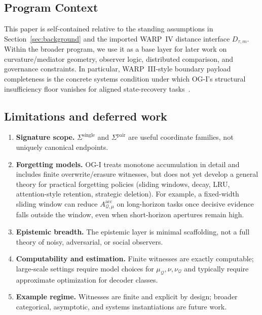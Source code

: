 \documentclass[11pt,twoside]{article}
\theoremstyle{definition}
\newcommand{\acc}{\mathrm{acc}}
\begin{document}
\subsection{Program Context}
\label{subsec:series-consequences}

This paper is self-contained relative to the standing assumptions in Section~\ref{sec:background} and the imported WARP~IV distance interface \(D_{\tau,m}\). Within the broader program, we use it as a base layer for later work on curvature/mediator geometry, observer logic, distributed comparison, and governance constraints. In particular, WARP~III-style boundary payload completeness is the concrete systems condition under which OG-I's structural insufficiency floor vanishes for aligned state-recovery tasks~\cite{ross_paper_iii}.

\subsection{Limitations and deferred work}
\label{subsec:limitations}

\begin{enumerate}[leftmargin=*]
  \item \textbf{Signature scope.} \(\Sigma^{\mathrm{single}}\) and \(\Sigma^{\mathrm{pair}}\) are useful coordinate families, not uniquely canonical endpoints.
  \item \textbf{Forgetting models.} OG-I treats monotone accumulation in detail and includes finite overwrite/erasure witnesses, but does not yet develop a general theory for practical forgetting policies (sliding windows, decay, LRU, attention-style retention, strategic deletion). For example, a fixed-width sliding window can reduce \(A^{\acc}_{\mathcal{Q},\mu}\) on long-horizon tasks once decisive evidence falls outside the window, even when short-horizon apertures remain high.
  \item \textbf{Epistemic breadth.} The epistemic layer is minimal scaffolding, not a full theory of noisy, adversarial, or social observers.
  \item \textbf{Computability and estimation.} Finite witnesses are exactly computable; large-scale settings require model choices for \(\mu_{\mathcal{Q}},\nu,\nu_{\mathcal{Q}}\) and typically require approximate optimization for decoder classes.
  \item \textbf{Example regime.} Witnesses are finite and explicit by design; broader categorical, asymptotic, and systems instantiations are future work.
\end{enumerate}
\end{document}
